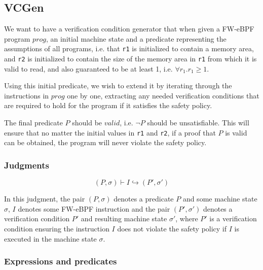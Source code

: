 \subsection{VCGen}
\label{subsec:vcgen}

We want to have a verification condition generator that when given a FW-eBPF program $prog$, an initial machine state and a predicate representing the assumptions of all programs, i.e. that \texttt{r1} is initialized to contain a memory area, and \texttt{r2} is initialized to contain the size of the memory area in \texttt{r1} from which it is valid to read, and also guaranteed to be at least 1, i.e. $\forall r_1 . r_1 \geq 1$.


Using this initial predicate, we wish to extend it by iterating through the instructions in $prog$ one by one, extracting any needed verification conditions that are required to hold for the program if it satisfies the safety policy.

The final predicate $P$ should be $valid$, i.e. $\neg P$ should be unsatisfiable.
This will ensure that no matter the initial values in \texttt{r1} and \texttt{r2}, if a proof that $P$ is valid can be obtained, the program will never violate the safety policy.


\subsubsection{Judgments}


\[
  (P ,\sigma) \vdash I \hookrightarrow (P',\sigma')
\]

In this judgment, the pair $(P, \sigma)$ denotes a predicate $P$ and some machine state $\sigma$, $I$ denotes some FW-eBPF instruction and the pair $(P', \sigma')$ denotes a verification condition $P'$ and resulting machine state $\sigma'$, where $P'$ is a verification condition ensuring the instruction $I$ does not violate the safety policy if $I$ is executed in the machine state $\sigma$.



\subsubsection{Expressions and predicates}

